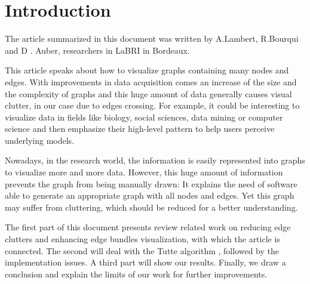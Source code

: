 \chapter*{Introduction}

The article summarized in this document was written by A.Lambert, R.Bourqui and D . Auber, researchers in LaBRI in Bordeaux.


This article speaks about how to visualize graphs containing many nodes and edges. With improvements in data acquisition comes an increase of the size and the complexity of graphs and this huge amount of data generally causes visual clutter, in our case due to edges crossing.
For example, it could be interesting to visualize data in fields like biology, social sciences, data mining or computer science and then emphasize their high-level pattern to help users perceive underlying models.


Nowadays, in the research world, the information is easily represented into graphs to visualize more and more data. However, this huge amount of information prevents the graph from being manually drawn:  It explains the need of software able to generate an appropriate graph with all nodes and edges. Yet this graph may suffer from cluttering, which should be reduced for a better understanding.


The first part of this document presents review related work on reducing edge clutters and enhancing edge bundles visualization, with which the article is connected. The second will deal with the Tutte algorithm , followed by the implementation issues. A third part will show our results. Finally, we draw a conclusion and explain the limits of our work for further improvements.
